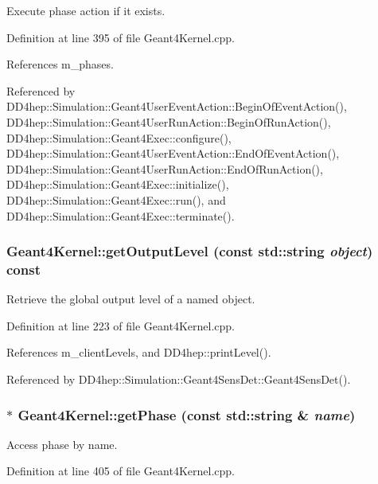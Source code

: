 Execute phase action if it exists. 

Definition at line 395 of file Geant4Kernel.cpp.

References m\_\-phases.

Referenced by DD4hep::Simulation::Geant4UserEventAction::BeginOfEventAction(), DD4hep::Simulation::Geant4UserRunAction::BeginOfRunAction(), DD4hep::Simulation::Geant4Exec::configure(), DD4hep::Simulation::Geant4UserEventAction::EndOfEventAction(), DD4hep::Simulation::Geant4UserRunAction::EndOfRunAction(), DD4hep::Simulation::Geant4Exec::initialize(), DD4hep::Simulation::Geant4Exec::run(), and DD4hep::Simulation::Geant4Exec::terminate().\hypertarget{class_d_d4hep_1_1_simulation_1_1_geant4_kernel_a0b9efcb33597d3a7191f3067c2691473}{
\subsubsection[{getOutputLevel}]{ Geant4Kernel::getOutputLevel (const std::string {\em object}) const}}
\label{class_d_d4hep_1_1_simulation_1_1_geant4_kernel_a0b9efcb33597d3a7191f3067c2691473}


Retrieve the global output level of a named object. 

Definition at line 223 of file Geant4Kernel.cpp.

References m\_\-clientLevels, and DD4hep::printLevel().

Referenced by DD4hep::Simulation::Geant4SensDet::Geant4SensDet().\hypertarget{class_d_d4hep_1_1_simulation_1_1_geant4_kernel_ada608fd803fba670ab573da9a7a012eb}{
\subsubsection[{getPhase}]{ $\ast$ Geant4Kernel::getPhase (const std::string \& {\em name})}}
\label{class_d_d4hep_1_1_simulation_1_1_geant4_kernel_ada608fd803fba670ab573da9a7a012eb}


Access phase by name. 

Definition at line 405 of file Geant4Kernel.cpp.

